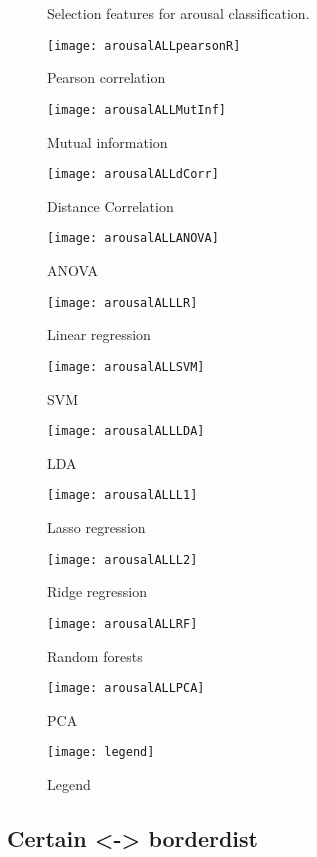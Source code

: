 \begin{figure}[!tbp]
  \centering
  \caption{Selection features for arousal classification.\label{arousalpies}}
  \begin{minipage}[b]{0.3\textwidth}
    \texttt{[image: arousalALLpearsonR]}
    \caption{Pearson correlation}
  \end{minipage}
  \hfill
  \begin{minipage}[b]{0.3\textwidth}
    \texttt{[image: arousalALLMutInf]}
    \caption{Mutual information}
  \end{minipage}
  \hfill
  \begin{minipage}[b]{0.3\textwidth}
    \texttt{[image: arousalALLdCorr]}
    \caption{Distance Correlation}
  \end{minipage}
  
  \begin{minipage}[b]{0.3\textwidth}
    \texttt{[image: arousalALLANOVA]}
    \caption{ANOVA}
  \end{minipage}
  \hfill
  \begin{minipage}[b]{0.3\textwidth}
    \texttt{[image: arousalALLLR]}
    \caption{Linear regression}
  \end{minipage}
  \hfill
  \begin{minipage}[b]{0.3\textwidth}
    \texttt{[image: arousalALLSVM]}
    \caption{SVM}
  \end{minipage}
  
  \begin{minipage}[b]{0.3\textwidth}
    \texttt{[image: arousalALLLDA]}
    \caption{LDA}
  \end{minipage}
  \hfill
  \begin{minipage}[b]{0.3\textwidth}
    \texttt{[image: arousalALLL1]}
    \caption{Lasso regression}
  \end{minipage}
  \hfill
  \begin{minipage}[b]{0.3\textwidth}
    \texttt{[image: arousalALLL2]}
    \caption{Ridge regression}
  \end{minipage}
  
  \begin{minipage}[b]{0.3\textwidth}
    \texttt{[image: arousalALLRF]}
    \caption{Random forests}
  \end{minipage}
  \hfill
  \begin{minipage}[b]{0.3\textwidth}
    \texttt{[image: arousalALLPCA]} %
    \caption{PCA}
  \end{minipage}
  \hfill
  \begin{minipage}[b]{0.3\textwidth}
    \texttt{[image: legend]}
    \caption{Legend\label{arousalpieslegend}}
  \end{minipage}
\end{figure}
\clearpage





\subsection{Certain <-> borderdist}

